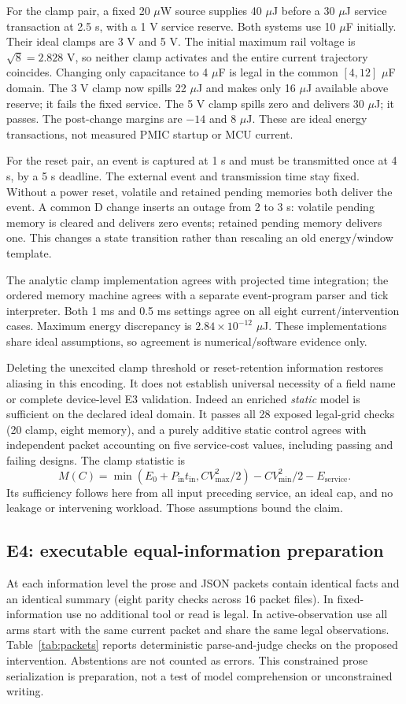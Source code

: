 \documentclass[10pt]{article}
\begin{document}
For the clamp pair, a fixed 20 $\mu$W source supplies 40 $\mu$J before a 30 $\mu$J service transaction at 2.5 s, with a 1 V service reserve. Both systems use 10 $\mu$F initially. Their ideal clamps are 3 V and 5 V. The initial maximum rail voltage is $\sqrt{8}=2.828$ V, so neither clamp activates and the entire current trajectory coincides. Changing only capacitance to 4 $\mu$F is legal in the common $[4,12]$ $\mu$F domain. The 3 V clamp now spills 22 $\mu$J and makes only 16 $\mu$J available above reserve; it fails the fixed service. The 5 V clamp spills zero and delivers 30 $\mu$J; it passes. The post-change margins are $-14$ and $8$ $\mu$J. These are ideal energy transactions, not measured PMIC startup or MCU current.

For the reset pair, an event is captured at 1 s and must be transmitted once at 4 s, by a 5 s deadline. The external event and transmission time stay fixed. Without a power reset, volatile and retained pending memories both deliver the event. A common D change inserts an outage from 2 to 3 s: volatile pending memory is cleared and delivers zero events; retained pending memory delivers one. This changes a state transition rather than rescaling an old energy/window template.

The analytic clamp implementation agrees with projected time integration; the ordered memory machine agrees with a separate event-program parser and tick interpreter. Both 1 ms and 0.5 ms settings agree on all eight current/intervention cases. Maximum energy discrepancy is $2.84\times 10^{-12}$ $\mu$J. These implementations share ideal assumptions, so agreement is numerical/software evidence only.

Deleting the unexcited clamp threshold or reset-retention information restores aliasing in this encoding. It does not establish universal necessity of a field name or complete device-level E3 validation. Indeed an enriched \emph{static} model is sufficient on the declared ideal domain. It passes all 28 exposed legal-grid checks (20 clamp, eight memory), and a purely additive static control agrees with independent packet accounting on five service-cost values, including passing and failing designs. The clamp statistic is
\[
 M(C)=\min(E_0+P_{\mathrm{in}}t_{\mathrm{in}},CV_{\max}^2/2)-CV_{\min}^2/2-E_{\mathrm{service}}.
\]
Its sufficiency follows here from all input preceding service, an ideal cap, and no leakage or intervening workload. Those assumptions bound the claim.

\subsection{E4: executable equal-information preparation}
At each information level the prose and JSON packets contain identical facts and an identical summary (eight parity checks across 16 packet files). In fixed-information use no additional tool or read is legal. In active-observation use all arms start with the same current packet and share the same legal observations. Table~\ref{tab:packets} reports deterministic parse-and-judge checks on the proposed intervention. Abstentions are not counted as errors. This constrained prose serialization is preparation, not a test of model comprehension or unconstrained writing.
\end{document}
